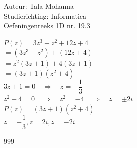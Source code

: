 \documentclass[a4paper]{article}
\begin{document}
\noindent \large Auteur: Tala Mohanna \\
\noindent \large Studierichting: Informatica\\
\noindent \large Oefeningenreeks 1D nr. 19.3\\

\medskip

\normalsize


$P(z) = 3z^3 + z^2 + 12z + 4$ \\

$=(3z^3 + z^2) + (12z + 4)$\\

$= z^2(3z + 1) + 4(3z + 1) $\\

$ =(3z + 1)(z^2 + 4)$ \\

$3z + 1 = 0 \quad \Rightarrow \quad z = -\dfrac{1}{3} $\\

$z^2 + 4 = 0 \quad \Rightarrow \quad z^2 = -4 \quad \Rightarrow \quad z = \pm 2i$\\

$P(z) = (3z + 1)(z^2 + 4)$ \\

$z = -\dfrac{1}{3},  z = 2i,  z = -2i$ \\

\begin{thebibliography}{999}
\end{thebibliography}
\end{document}
